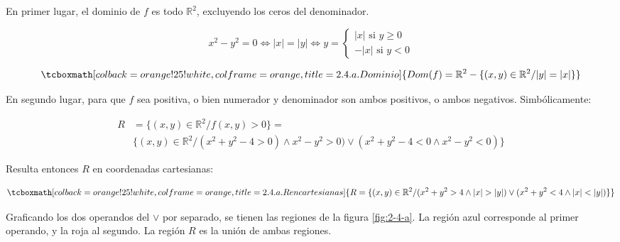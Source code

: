 \documentclass{article}
\renewcommand{\Bbb}{\mathbb}
\begin{document}
En primer lugar, el dominio de $f$ es todo $\Bbb R^2$, excluyendo los ceros del denominador.

\begin{equation}
x^2 - y^2 = 0 \Leftrightarrow |x| = |y| \Leftrightarrow y = \left\{
\begin{array}{ll}
|x| \text{ si } y \geq 0 \\
-|x| \text{ si } y < 0
\end{array}
\right.
\end{equation}

\begin{equation}
\tcboxmath[colback=orange!25!white,colframe=orange,title=2.4.a. Dominio]
{ \mathop{Dom}(f) = \Bbb R^2 - \{ (x,y) \in \Bbb R^2 / |y| = |x| \} }
\end{equation}

En segundo lugar, para que $f$ sea positiva, o bien numerador y denominador son ambos positivos, o ambos negativos. Simbólicamente:

\begin{subequations}
\begin{align}
R &= \{ (x,y) \in \Bbb R^2 / f(x,y) > 0 \} = \\
& \{ (x,y) \in \Bbb R^2 / (x^2 + y^2 - 4 > 0) \wedge x^2 - y^2 > 0) \vee (x^2 + y^2 - 4 < 0 \wedge x^2 - y^2 < 0) \}
\end{align}
\end{subequations}

Resulta entonces $R$ en coordenadas cartesianas:

\begin{equation}
\tcboxmath[colback=orange!25!white,colframe=orange,title=2.4.a. R en cartesianas]
{ R = \{ (x,y) \in \Bbb R^2 / (x^2 + y^2 > 4 \wedge |x| > |y|) \vee (x^2 + y^2 < 4 \wedge |x| < |y|) \} }
\end{equation}

Graficando los dos operandos del $\vee$ por separado, se tienen las regiones de la figura \ref{fig:2-4-a}. La región azul corresponde al primer operando, y la roja al segundo. La región $R$ es la unión de ambas regiones. 
\end{document}
